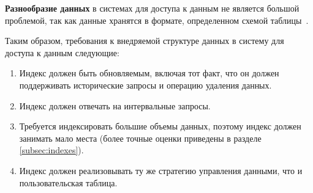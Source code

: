 \textbf{Разнообразие данных} в системах для доступа к данным не является большой проблемой, так как данные хранятся в формате, определенном схемой таблицы~\cite{Hudi_SQL_DDL}.

Таким образом, требования к внедряемой структуре данных в систему для доступа к данным следующие:
\begin{enumerate}
    \item Индекс должен быть обновляемым, включая тот факт, что он должен поддерживать исторические запросы и операцию удаления данных.
    \item Индекс должен отвечать на интервальные запросы.
    \item Требуется индексировать большие объемы данных, поэтому индекс должен занимать мало места (более точные оценки приведены в разделе \ref{subsec:indexes}).
    \item Индекс должен реализовывать ту же стратегию управления данными, что и пользовательская таблица.
\end{enumerate}

